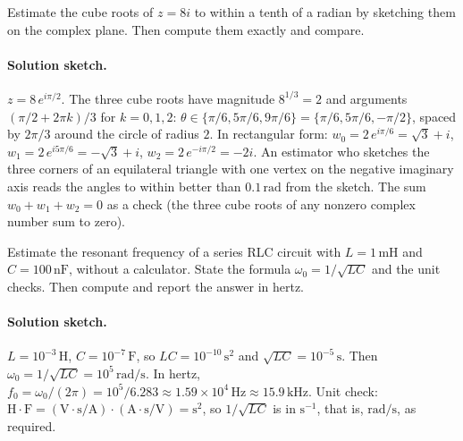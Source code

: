 \begin{exercise}
Estimate the cube roots of $z = 8i$ to within a tenth of a
radian by sketching them on the complex plane. Then compute
them exactly and compare.

\paragraph{Solution sketch.}
$z = 8\,e^{i\pi/2}$. The three cube roots have magnitude
$8^{1/3} = 2$ and arguments $(\pi/2 + 2\pi k)/3$ for $k = 0, 1, 2$:
$\theta \in \{\pi/6, 5\pi/6, 9\pi/6\} = \{\pi/6, 5\pi/6, -\pi/2\}$,
spaced by $2\pi/3$ around the circle of radius $2$. In rectangular
form: $w_{0} = 2\,e^{i\pi/6} = \sqrt{3} + i$,
$w_{1} = 2\,e^{i 5\pi/6} = -\sqrt{3} + i$,
$w_{2} = 2\,e^{-i\pi/2} = -2i$. An estimator who sketches the
three corners of an equilateral triangle with one vertex on the
negative imaginary axis reads the angles to within better than
$0.1\,\text{rad}$ from the sketch. The sum $w_{0} + w_{1} + w_{2}
= 0$ as a check (the three cube roots of any nonzero complex
number sum to zero).
\end{exercise}

\begin{exercise}
Estimate the resonant frequency of a series RLC circuit with
$L = 1 \,\si{\milli\henry}$ and $C = 100 \,\si{\nano\farad}$,
without a calculator. State the formula $\omega_{0} = 1/\sqrt{LC}$
and the unit checks. Then compute and report the answer in
hertz.

\paragraph{Solution sketch.}
$L = 10^{-3}\,\si{\henry}$, $C = 10^{-7}\,\si{\farad}$, so $LC =
10^{-10}\,\si{\second\squared}$ and $\sqrt{LC} = 10^{-5}\,\si
{\second}$. Then $\omega_{0} = 1/\sqrt{LC} = 10^{5}\,\si{\radian
\per\second}$. In hertz, $f_{0} = \omega_{0}/(2\pi) = 10^{5}/6.283
\approx 1.59 \times 10^{4}\,\si{\hertz} \approx 15.9\,\si
{\kilo\hertz}$. Unit check: $\si{\henry} \cdot \si{\farad} =
(\si{\volt}\cdot\si{\second}/\si{\ampere}) \cdot (\si{\ampere}\cdot
\si{\second}/\si{\volt}) = \si{\second\squared}$, so $1/\sqrt{LC}$
is in $\si{\second^{-1}}$, that is, $\si{\radian\per\second}$,
as required.
\end{exercise}

